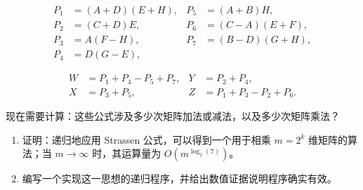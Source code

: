 \documentclass[UTF8,fontset=none,12pt]{ctexart}
\begin{document}
\begin{align*}
P_1&=(A+D)(E+H), & P_5&=(A+B)H,\\
P_2&=(C+D)E, & P_6&=(C-A)(E+F),\\
P_3&=A(F-H), & P_7&=(B-D)(G+H),\\
P_4&=D(G-E), &&
\end{align*}

\begin{align*}
W&=P_1+P_4-P_5+P_7, & Y&=P_2+P_4,\\
X&=P_3+P_5, & Z&=P_1+P_3-P_2+P_6.
\end{align*}

现在需要计算：这些公式涉及多少次矩阵加法或减法，以及多少次矩阵乘法？

\begin{enumerate}[label=(\alph*),start=3]
\item 证明：递归地应用 Strassen 公式，可以得到一个用于相乘 $m=2^k$ 维矩阵的算法；当 $m\to\infty$ 时，其运算量为 $O(m^{\log_2(7)})$。
\item 编写一个实现这一思想的递归程序，并给出数值证据说明程序确实有效。
\end{enumerate}
\end{document}
